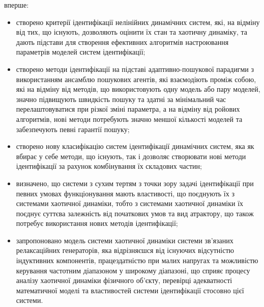 \documentclass[a4paper,13pt]{atuaref}
\begin{document}
\noindent
вперше:

\begin{itemize}

  \item
  створено критерії ідентифікації нелінійних динамічних систем,
  які, на відміну від тих, що існують, дозволяють оцінити їх стан та
  хаотичну динаміку, та дають підстави для створення ефективних алгоритмів
  настроювання параметрів моделей систем ідентифікації;

  \item
  створено методи ідентифікації на підставі
  адаптивно-пошукової парадигми з використанням ансамблю пошукових агентів,
  які взаємодіють проміж собою, які на відміну від методів, що використовують
  одну модель або пару моделей, значно підвищують швидкість пошуку та
  здатні за мінімальний час  перелаштовуватися при різкої зміні параметра, а на
  відміну від ройових алгоритмів, нові методи потребують значно меншої
  кількості моделей та забезпечують певні гарантії пошуку;

  \item
  створено нову класифікацію систем ідентифікації динамічних систем,
  яка як вбирає у себе методи, що існують, так і дозволяє
  створювати нові методи ідентифікації за рахунок
  комбінування їх складових частин;

  \item
   визначено, що системи з сухим тертям з точки зору задачі ідентифікації
   при певних  умовах функціонування
   мають властивості, що поєднують їх з системами хаотичної динаміки, тобто з
   системами хаотичної динаміки їх поєднує суттєва залежність від початкових
   умов та вид атрактору, що також потребує використання нових методів ідентифікації;

  \item
   запропоновано модель системи хаотичної динаміки системи зв'язаних релаксаційних генераторів,
   яка відрізняєшся від існуючих відсутністю індуктивних компонентів,
   працездатністю при малих напругах та можливістю
   керування частотним діапазоном у широкому діапазоні,
   що сприяє процесу аналізу хаотичної динаміки
   фізичного об'єкту, перевірці адекватності математичної моделі
   та властивостей системи ідентифікації стосовно цієї системи.
\end{itemize}
\end{document}

